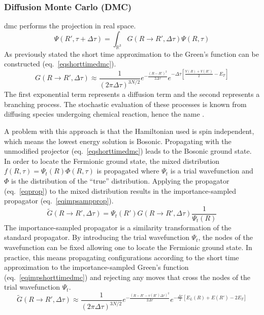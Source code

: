 \subsubsection{Diffusion Monte Carlo (DMC)}
\gls{dmc} performs the projection in real space.\cite{10.1016/bs.aiq.2015.07.003,10.1103/RevModPhys.73.33}
\begin{equation}
    \Psi(R',\tau + \Delta\tau) = \int_{\mathbb{R}^3} G(R \rightarrow R',\Delta \tau) \Psi(R,\tau)
\end{equation}
As previously stated the short time approximation to the Green's function can be constructed (eq.~\ref{eqshorttimedmc}).
\begin{equation}
    G(R \rightarrow R', \Delta \tau) \approx \frac{1}{(2\pi\Delta\tau)^{3N/2}} e^{-\frac{(R - R')^2 }{2\Delta\tau}} e^{-\Delta\tau[\frac{V(R) + V(R')}{2} - E_T]}
\label{eqshorttimedmc}
\end{equation}
The first exponential term represents a diffusion term and the second represents a branching process.
The stochastic evaluation of these processes is known from diffusing species undergoing chemical reaction, hence the name .

A problem with this approach is that the Hamiltonian used is spin independent, which means the lowest energy solution is Bosonic.
Propagating with the unmodified projector (eq.~\ref{eqshorttimedmc}) leads to the Bosonic ground state.
In order to locate the Fermionic ground state, the mixed distribution $f(R,\tau) = \Psi_t(R)\Phi(R,\tau)$ is propagated where $\Psi_t$ is a trial wavefunction and $\Phi$ is the distribution of the ``true'' distribution.
Applying the propagator (eq.~\ref{eqprop}) to the mixed distribution results in the importance-sampled propagator (eq.~\ref{eqimpsampprop}). 
\begin{equation}
    \tilde{G}(R \rightarrow R', \Delta \tau)  = \Psi_t(R') G(R \rightarrow R', \Delta \tau) \frac{1}{\Psi_t(R)}
\label{eqimpsampprop}
\end{equation}
The importance-sampled propagator is a similarity transformation of the standard propagator.
By introducing the trial wavefunction $\Psi_t$, the nodes of the wavefunction can be fixed allowing one to locate the Fermionic ground state.
In practice, this means propagating configurations according to the short time approximation to the importance-sampled Green's function (eq.~\ref{eqimpshorttimedmc}) and rejecting any moves that cross the nodes of the trial wavefunction $\Psi_t$.
\begin{equation}
    \tilde{G}(R \rightarrow R', \Delta \tau) \approx \frac{1}{(2\pi\Delta\tau)^{3N/2}} e^{-\frac{(R - R' - v(R') \Delta \tau)^2 }{2\Delta\tau}} e^{-\frac{\Delta\tau}{2}[E_L(R) + E(R') - 2E_T]}
\label{eqimpshorttimedmc}
\end{equation}


